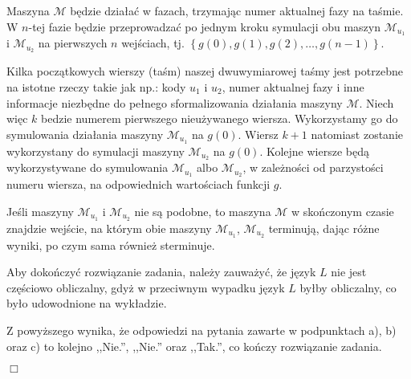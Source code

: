 \documentclass[12pt]{article}
\begin{document}
	Maszyna \(\mathcal{M}\) będzie działać w fazach, trzymając numer aktualnej
	fazy na taśmie. W \(n\)-tej fazie będzie przeprowadzać po jednym kroku
	symulacji obu maszyn \(\mathcal{M}_{u_{1}}\) i \(\mathcal{M}_{u_{2}}\)
	na pierwszych \(n\) wejściach, tj. \(\left\{ g \left( 0 \right), g \left( 1
	\right), g \left( 2 \right), \ldots, g \left( n - 1 \right) \right\}\).
	
	\medskip
	
	Kilka początkowych wierszy (taśm) naszej dwuwymiarowej taśmy jest potrzebne
	na istotne rzeczy takie jak np.: kody \(u_{1}\) i \(u_{2}\), numer aktualnej
	fazy i inne informacje niezbędne do pełnego sformalizowania działania
	maszyny \(\mathcal{M}\). Niech więc \(k\) bedzie numerem pierwszego
	nieużywanego wiersza. Wykorzystamy go do symulowania działania maszyny
	\(\mathcal{M}_{u_{1}}\) na \(g \left( 0 \right)\). Wiersz \(k + 1\)
	natomiast zostanie wykorzystany do symulacji maszyny \(\mathcal{M}_{u_{2}}\)
	na \(g \left( 0 \right)\). Kolejne wiersze będą wykorzystywane do
	symulowania \(\mathcal{M}_{u_{1}}\) albo \(\mathcal{M}_{u_{2}}\), w
	zależności od parzystości numeru wiersza, na odpowiednich wartościach
	funkcji \(g\).
	
	\medskip
	
	Jeśli maszyny \(\mathcal{M}_{u_{1}}\) i \(\mathcal{M}_{u_{2}}\) nie są
	podobne, to maszyna \(\mathcal{M}\) w skończonym czasie znajdzie wejście,
	na którym obie maszyny \(\mathcal{M}_{u_{1}}\), \(\mathcal{M}_{u_{2}}\)
	terminują, dając różne wyniki, po czym sama również sterminuje.
	
	\bigskip
	
	Aby dokończyć rozwiązanie zadania, należy zauważyć, że język \(L\) nie jest
	częściowo obliczalny, gdyż w przeciwnym wypadku język \(L\) byłby
	obliczalny, co było udowodnione na wykładzie.
	
	\bigskip
	
	Z powyższego wynika, że odpowiedzi na pytania zawarte w podpunktach a), b)
	oraz c) to kolejno ,,Nie.'', ,,Nie.'' oraz ,,Tak.'', co kończy rozwiązanie
	zadania.
	\begin{flushright}
		\(\Box\)
	\end{flushright}
\end{document}
